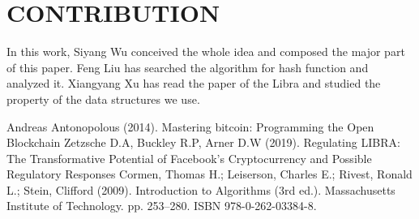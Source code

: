 \documentclass[conference]{IEEEtran}
\begin{document}
\section{CONTRIBUTION}
In this work, Siyang Wu conceived the whole idea and composed the major part of this paper. Feng Liu has searched the algorithm for hash function and analyzed it. Xiangyang Xu has read the paper of the Libra and studied the property of the data structures we use.  

\begin{thebibliography}{00}
 Andreas Antonopolous (2014). Mastering bitcoin: Programming the Open Blockchain
 Zetzsche D.A, Buckley R.P, Arner D.W (2019). Regulating LIBRA: The Transformative Potential of Facebook’s Cryptocurrency and Possible Regulatory Responses
 Cormen, Thomas H.; Leiserson, Charles E.; Rivest, Ronald L.; Stein, Clifford (2009). Introduction to Algorithms (3rd ed.). Massachusetts Institute of Technology. pp. 253–280. ISBN 978-0-262-03384-8.
\end{thebibliography}
\end{document}
